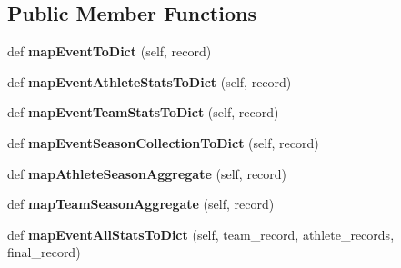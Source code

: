 \subsection*{Public Member Functions}
\begin{DoxyCompactItemize}
\item 
\mbox{\label{classhandler_1_1volleyball__event_1_1_volleyball_event_handler_a911a41552fe5f99a26a0d8b4fb850696}} 
def {\bfseries map\+Event\+To\+Dict} (self, record)
\item 
\mbox{\label{classhandler_1_1volleyball__event_1_1_volleyball_event_handler_a25ff0c35091f4cde1fe18fad0ddd01bd}} 
def {\bfseries map\+Event\+Athlete\+Stats\+To\+Dict} (self, record)
\item 
\mbox{\label{classhandler_1_1volleyball__event_1_1_volleyball_event_handler_a9111d146e4156e7ea4e439e9ac8a15fc}} 
def {\bfseries map\+Event\+Team\+Stats\+To\+Dict} (self, record)
\item 
\mbox{\label{classhandler_1_1volleyball__event_1_1_volleyball_event_handler_a892b5396f545b81af0ba66d8a2e148b6}} 
def {\bfseries map\+Event\+Season\+Collection\+To\+Dict} (self, record)
\item 
\mbox{\label{classhandler_1_1volleyball__event_1_1_volleyball_event_handler_ac6fdd50a88effeb857b6094e8f5c1615}} 
def {\bfseries map\+Athlete\+Season\+Aggregate} (self, record)
\item 
\mbox{\label{classhandler_1_1volleyball__event_1_1_volleyball_event_handler_ab241bcf875cb8474d1690eb659affc92}} 
def {\bfseries map\+Team\+Season\+Aggregate} (self, record)
\item 
\mbox{\label{classhandler_1_1volleyball__event_1_1_volleyball_event_handler_a8f3e7f586fb7af1fe900b6c1f63885b4}} 
def {\bfseries map\+Event\+All\+Stats\+To\+Dict} (self, team\+\_\+record, athlete\+\_\+records, final\+\_\+record)

\end{DoxyCompactItemize}
